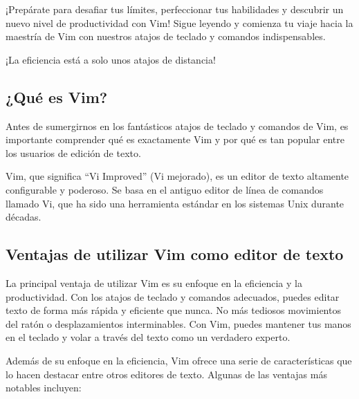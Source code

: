 \documentclass[
  doc,
  floatsintext,
  longtable,
  a4paper,
  nolmodern,
  notxfonts,
  notimes,
  12pt,
  colorlinks=true,linkcolor=blue,citecolor=blue,urlcolor=blue]{apa7}
\begin{document}
¡Prepárate para desafiar tus límites, perfeccionar tus habilidades y
descubrir un nuevo nivel de productividad con Vim! Sigue leyendo y
comienza tu viaje hacia la maestría de Vim con nuestros atajos de
teclado y comandos indispensables.

¡La eficiencia está a solo unos atajos de distancia!

\subsection{¿Qué es Vim?}\label{quuxe9-es-vim}

Antes de sumergirnos en los fantásticos atajos de teclado y comandos de
Vim, es importante comprender qué es exactamente Vim y por qué es tan
popular entre los usuarios de edición de texto.

Vim, que significa ``Vi Improved'' (Vi mejorado), es un editor de texto
altamente configurable y poderoso. Se basa en el antiguo editor de línea
de comandos llamado Vi, que ha sido una herramienta estándar en los
sistemas Unix durante décadas.

\subsection{Ventajas de utilizar Vim como editor de
texto}\label{ventajas-de-utilizar-vim-como-editor-de-texto}

La principal ventaja de utilizar Vim es su enfoque en la eficiencia y la
productividad. Con los atajos de teclado y comandos adecuados, puedes
editar texto de forma más rápida y eficiente que nunca. No más tediosos
movimientos del ratón o desplazamientos interminables. Con Vim, puedes
mantener tus manos en el teclado y volar a través del texto como un
verdadero experto.

Además de su enfoque en la eficiencia, Vim ofrece una serie de
características que lo hacen destacar entre otros editores de texto.
Algunas de las ventajas más notables incluyen:
\end{document}
